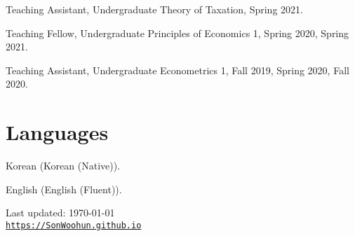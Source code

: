 \documentclass[letterpaper]{article}
\def\footerlink{https://SonWoohun.github.io}
\renewenvironment{itemize}{
  \begin{list}{}{
    \setlength{\leftmargin}{1.5em}
  }
}{
  \end{list}
}
\begin{document}
\begin{itemize}
\item Teaching Assistant, Undergraduate Theory of Taxation, Spring 2021.
\item Teaching Fellow, Undergraduate Principles of Economics 1, Spring 2020, Spring 2021.
\item Teaching Assistant, Undergraduate Econometrics 1, Fall 2019, Spring 2020, Fall 2020.
\end{itemize}


\section*{Languages}

\begin{itemize}
\item Korean (Korean (Native)).
\item English (English (Fluent)).
\end{itemize}


\bigskip

\begin{center}
  \begin{footnotesize}
    Last updated: \today \\
    \href{\footerlink}{\texttt{\footerlink}}
  \end{footnotesize}
\end{center}
\end{document}

